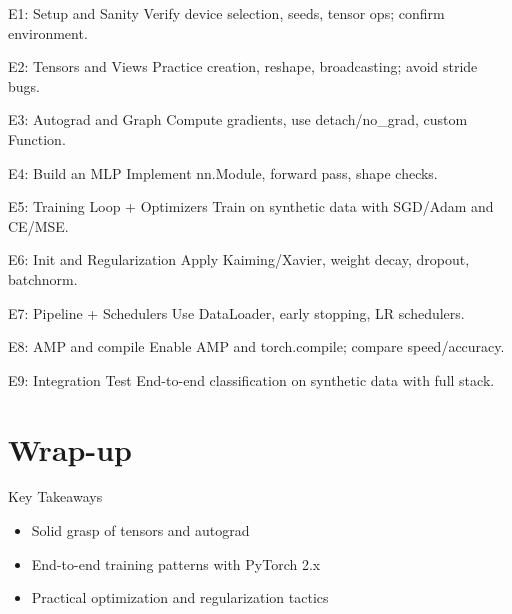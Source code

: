 \documentclass[aspectratio=169,10pt]{beamer}
\begin{document}
\begin{frame}{E1: Setup and Sanity}
Verify device selection, seeds, tensor ops; confirm environment.
\end{frame}

\begin{frame}{E2: Tensors and Views}
Practice creation, reshape, broadcasting; avoid stride bugs.
\end{frame}

\begin{frame}{E3: Autograd and Graph}
Compute gradients, use detach/no\_grad, custom Function.
\end{frame}

\begin{frame}{E4: Build an MLP}
Implement nn.Module, forward pass, shape checks.
\end{frame}

\begin{frame}{E5: Training Loop + Optimizers}
Train on synthetic data with SGD/Adam and CE/MSE.
\end{frame}

\begin{frame}{E6: Init and Regularization}
Apply Kaiming/Xavier, weight decay, dropout, batchnorm.
\end{frame}

\begin{frame}{E7: Pipeline + Schedulers}
Use DataLoader, early stopping, LR schedulers.
\end{frame}

\begin{frame}{E8: AMP and compile}
Enable AMP and torch.compile; compare speed/accuracy.
\end{frame}

\begin{frame}{E9: Integration Test}
End-to-end classification on synthetic data with full stack.
\end{frame}

\section{Wrap-up}

\begin{frame}{Key Takeaways}
\begin{itemize}
    \item Solid grasp of tensors and autograd
    \item End-to-end training patterns with PyTorch 2.x
    \item Practical optimization and regularization tactics
\end{itemize}
\end{frame}
\end{document}
